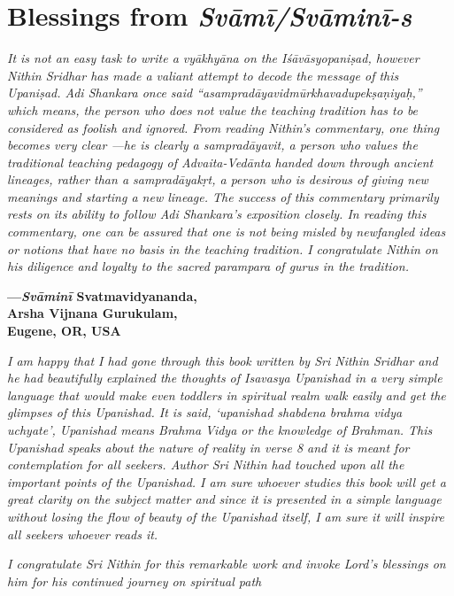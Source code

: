 \chapter{Blessings from \emph{Svāmī/Svāminī-s}}

\emph{It is not an easy task to write a vyākhyāna on the Iśāvāsyopaniṣad, however Nithin Sridhar has made a valiant attempt to decode the message of this Upaniṣad. Adi Shankara once said ``asampradāyavidmūrkhavadupekṣaṇiyaḥ,'' which means, the person who does not value the teaching tradition has to be considered as foolish and ignored. From reading Nithin's commentary, one thing becomes very clear ---he is clearly a sampradāyavit, a person who values the traditional teaching pedagogy of Advaita-Vedānta handed down through ancient lineages, rather than a sampradāyakṛt, a person who is desirous of giving new meanings and starting a new lineage. The success of this commentary primarily rests on its ability to follow Adi Shankara's exposition closely. In reading this commentary, one can be assured that one is not being misled by newfangled ideas or notions that have no basis in the teaching tradition. I congratulate Nithin on his diligence and loyalty to the sacred parampara of gurus in the tradition.}
\medskip

\begin{flushright}
\textbf{---\emph{Svāminī} Svatmavidyananda,}\\
\textbf{Arsha Vijnana Gurukulam,}\\
\textbf{Eugene, OR, USA}
\end{flushright}
\medskip

\emph{I am happy that I had gone through this book written by Sri Nithin Sridhar and he had beautifully explained the thoughts of Isavasya Upanishad in a very simple language that would make even toddlers in spiritual realm walk easily and get the glimpses of this Upanishad. It is said, `upanishad shabdena brahma vidya uchyate', Upanishad means Brahma Vidya or the knowledge of Brahman. This Upanishad speaks about the nature of reality in verse 8 and it is meant for contemplation for all seekers. Author Sri Nithin had touched upon all the important points of the Upanishad. I am sure whoever studies this book will get a great clarity on the subject matter and since it is presented in a simple language without losing the flow of beauty of the Upanishad itself, I am sure it will inspire all seekers whoever reads it.}

\emph{I congratulate Sri Nithin for this remarkable work and invoke Lord's blessings on him for his continued journey on spiritual path}
\medskip

